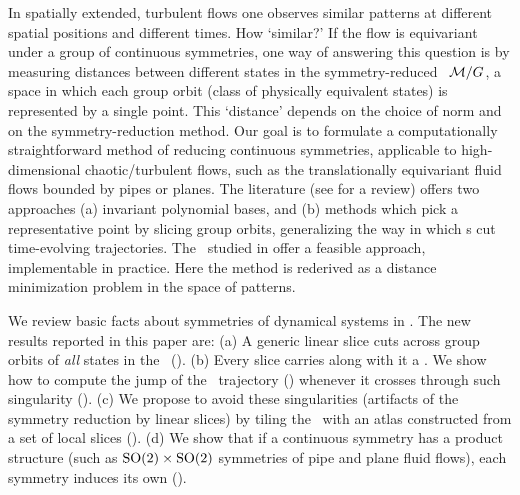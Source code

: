 

In spatially extended, turbulent flows one observes similar patterns at
different spatial positions and different times. How `similar?' If the
flow is equivariant under a group of continuous symmetries, one way of
answering this question is by measuring distances between different
states in the symmetry-reduced \statesp\ $\pS/\Group$, a space in which
each group orbit (class of physically equivalent states) is represented
by a single point. This `distance' depends on the choice of norm and on
the symmetry-reduction method. Our goal is to formulate a computationally
straightforward method of reducing continuous symmetries, applicable to
high-dimensional chaotic/turbulent flows, such as the translationally
equivariant fluid flows bounded by pipes or
planes. The literature (see
 for a review) offers two approaches (a)
invariant polynomial bases, and (b) methods which pick a representative
point by slicing group orbits, generalizing the way in which {\PoincSec}s
cut time-evolving trajectories. The \mslices\ studied in
 offer a feasible approach,
implementable in practice. Here the method is rederived as a distance
minimization problem in the space of patterns.

We review basic facts
about symmetries of dynamical systems in .
The new results reported in this paper are:
    (a) A generic linear slice cuts across group orbits of {\em all}
        states in the \statesp\ ().
    (b) Every slice carries along with it a {\sset}. We show how to
        compute the jump of the \reducedsp\ trajectory
         () whenever it crosses
        through such singularity  ().
    (c) We propose to avoid these singularities (artifacts of the symmetry
        reduction by linear slices) by tiling the \statesp\ with an atlas
        constructed from a set of local slices  ().
	(d) We show that if a continuous symmetry has a product structure
	   (such as $\textrm{SO}(2) \times \textrm{SO}(2)$ symmetries of pipe and plane
	   fluid flows), each symmetry induces its own {\sset} ().

